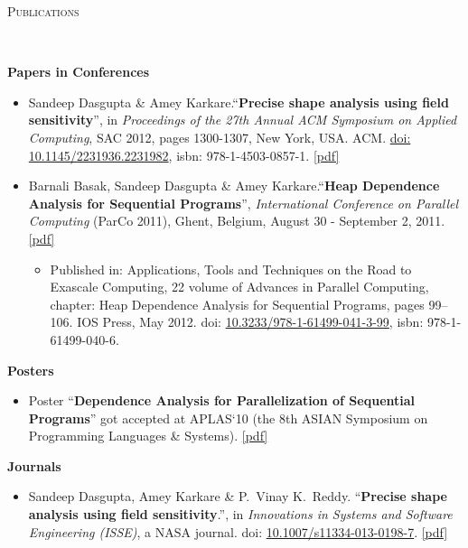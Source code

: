 \documentclass[9pt]{article}
\newenvironment{changemargin}[2]{%
  \begin{list}{}{%
    \setlength{\topsep}{0pt}%
    \setlength{\leftmargin}{#1}%
    \setlength{\rightmargin}{#2}%
    \setlength{\listparindent}{\parindent}%
    \setlength{\itemindent}{\parindent}%
    \setlength{\parsep}{\parskip}%
  }%
  \item[]}{\end{list}
}
\newcommand{\lineover}{
	\begin{changemargin}{-0.05in}{-0.05in}
		\vspace*{-8pt}
		\hrulefill \\
		\vspace*{-2pt}
	\end{changemargin}
}
\newcommand{\header}[1]{
	\begin{changemargin}{-0.5in}{-0.5in}
		\scshape{#1}\\
  	\lineover
	\end{changemargin}
}
\newenvironment{body} {
	\vspace*{-16pt}
	\begin{changemargin}{-0.25in}{-0.5in}
  }	
	{\end{changemargin}
}
\begin{document}
\header{Publications}
\begin{body}
\vspace{14pt}
\textbf{Papers in Conferences}\\
	\vspace*{-4pt}
	\begin{itemize} \itemsep -0pt
		\item Sandeep Dasgupta \& Amey Karkare.``\textbf{Precise shape analysis using field sensitivity}'', in \emph{Proceedings of the 27th Annual ACM Symposium on Applied Computing}, SAC 2012, pages 1300-1307, New York, USA. ACM. \href{http://dx.doi.org/10.1145/2245276.2231982}{doi: 10.1145/2231936.2231982}, isbn: 978-1-4503-0857-1. \href{https://dl.dropbox.com/u/86719354/sac\_2012.pdf}{[pdf]}\\

		\item Barnali Basak, Sandeep Dasgupta \& Amey Karkare.``\textbf{Heap Dependence Analysis for Sequential Programs}'', \emph{International Conference on Parallel Computing} (ParCo 2011), Ghent, Belgium, August 30 - September 2, 2011. \href{https://dl.dropbox.com/u/86719354/parco\_2011.pdf}{[pdf]} \\
		\begin{itemize} \itemsep -0pt
			\item Published in: Applications, Tools and Techniques on the Road to Exascale Computing, 22 volume of Advances in 
				Parallel Computing, chapter: Heap Dependence Analysis for Sequential Programs, pages 99--106. IOS Press, May 2012. 
				doi: \href{http://dx.doi.org/10.3233/978-1-61499-041-3-99}{10.3233/978-1-61499-041-3-99}, isbn: 978-1-61499-040-6.
		\end{itemize}
	\end{itemize}

\textbf{Posters}\\
	\vspace*{-4pt}
	\begin{itemize} \itemsep -0pt
		\item Poster ``\textbf{Dependence Analysis for Parallelization 
		of Sequential Programs}'' got accepted at APLAS`10 (the 8th ASIAN Symposium on Programming Languages \& Systems). \href{https://dl.dropbox.com/u/86719354/poster_APLAS2010.pdf}{[pdf]}
	\end{itemize}

\textbf{Journals}\\
	\vspace{-4pt}
	\begin{itemize} \itemsep -0pt
		\item  Sandeep Dasgupta, Amey Karkare \& P.\ Vinay K.\ Reddy. ``\textbf{Precise shape analysis using field sensitivity}.'', in \emph{Innovations in Systems and Software Engineering (ISSE)}, a NASA journal.
                 doi: \href{http://www.springerlink.com/openurl.asp?genre=article&id=doi:10.1007/s11334-013-0198-7}{10.1007/s11334-013-0198-7}. \href{https://dl.dropbox.com/u/86719354/publication_isse.pdf}{[pdf]}
	\end{itemize}
\end{body}
\end{document}
